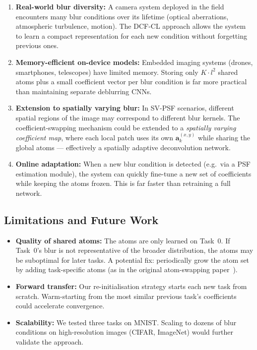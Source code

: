 \documentclass[11pt,letterpaper]{article}
\renewcommand{\a}{\mathbf{a}}
\begin{document}
\begin{enumerate}[leftmargin=*]
    \item \textbf{Real-world blur diversity:}  A camera system deployed in the
          field encounters many blur conditions over its lifetime (optical
          aberrations, atmospheric turbulence, motion).  The DCF-CL approach
          allows the system to learn a compact representation for each new
          condition without forgetting previous ones.

    \item \textbf{Memory-efficient on-device models:}  Embedded imaging
          systems (drones, smartphones, telescopes) have limited memory.
          Storing only $K \cdot l^2$ shared atoms plus a small coefficient
          vector per blur condition is far more practical than maintaining
          separate deblurring CNNs.

    \item \textbf{Extension to spatially varying blur:}  In SV-PSF scenarios,
          different spatial regions of the image may correspond to different
          blur kernels.  The coefficient-swapping mechanism could be extended
          to a \emph{spatially varying coefficient map}, where each local
          patch uses its own $\a_k^{(x,y)}$ while sharing the global atoms
          --- effectively a spatially adaptive deconvolution network.

    \item \textbf{Online adaptation:}  When a new blur condition is detected
          (e.g.\ via a PSF estimation module), the system can quickly
          fine-tune a new set of coefficients while keeping the atoms frozen.
          This is far faster than retraining a full network.
\end{enumerate}

\subsection{Limitations and Future Work}

\begin{itemize}[leftmargin=*]
    \item \textbf{Quality of shared atoms:}  The atoms are only learned on
          Task~0.  If Task~0's blur is not representative of the broader
          distribution, the atoms may be suboptimal for later tasks.  A
          potential fix: periodically grow the atom set by adding task-specific
          atoms (as in the original atom-swapping paper~\cite{miao2021continual}).

    \item \textbf{Forward transfer:}  Our re-initialisation strategy starts
          each new task from scratch.  Warm-starting from the most similar
          previous task's coefficients could accelerate convergence.

    \item \textbf{Scalability:}  We tested three tasks on MNIST.  Scaling to
          dozens of blur conditions on high-resolution images (CIFAR, ImageNet)
          would further validate the approach.
\end{itemize}
\end{document}
